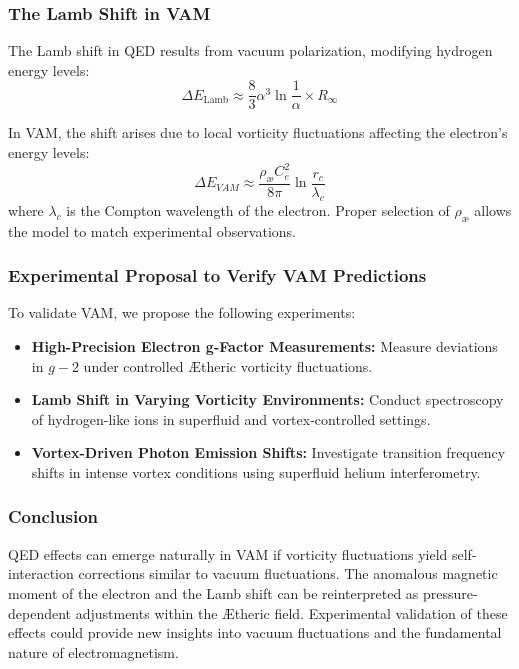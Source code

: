 \subsubsection*{The Lamb Shift in VAM}
The Lamb shift in QED results from vacuum polarization, modifying hydrogen energy levels:
\begin{equation*}
    \Delta E_{\text{Lamb}} \approx \frac{8}{3} \alpha^3 \ln \frac{1}{\alpha} \times R_{\infty}
\end{equation*}

In VAM, the shift arises due to local vorticity fluctuations affecting the electron's energy levels:
\begin{equation*}
    \Delta E_{VAM} \approx \frac{\rho_{\text{\ae}} C_e^2}{8\pi} \ln \frac{r_c}{\lambda_c}
\end{equation*}
where $\lambda_c$ is the Compton wavelength of the electron. Proper selection of $\rho_{\text{\ae}}$ allows the model to match experimental observations.

\subsubsection*{Experimental Proposal to Verify VAM Predictions}
To validate VAM, we propose the following experiments:
\begin{itemize}
    \item \textbf{High-Precision Electron g-Factor Measurements:} Measure deviations in $g-2$ under controlled Ætheric vorticity fluctuations.
    \item \textbf{Lamb Shift in Varying Vorticity Environments:} Conduct spectroscopy of hydrogen-like ions in superfluid and vortex-controlled settings.
    \item \textbf{Vortex-Driven Photon Emission Shifts:} Investigate transition frequency shifts in intense vortex conditions using superfluid helium interferometry.
\end{itemize}

\subsubsection*{Conclusion}
QED effects can emerge naturally in VAM if vorticity fluctuations yield self-interaction corrections similar to vacuum fluctuations. The anomalous magnetic moment of the electron and the Lamb shift can be reinterpreted as pressure-dependent adjustments within the Ætheric field. Experimental validation of these effects could provide new insights into vacuum fluctuations and the fundamental nature of electromagnetism.


